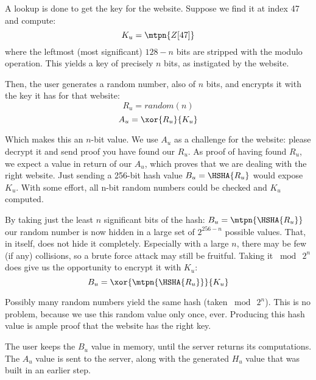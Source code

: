 A lookup is done to get the key for the website.
Suppose we find it at index 47 and compute:
\begin{equation}\label{rud:uku}
K_u = \mtpn{Z[47]}
\end{equation}
where the leftmost (most significant) $128 - n$ bits are stripped with the modulo operation.
This yields a key of precisely $n$ bits, as instigated by the website.
\par
Then, the user generates a random number, also of \(n\) bits, and encrypts it with the key it has for that website:
\begin{equation}\label{rud:uru}
R_u = random(n)
\end{equation}
\begin{equation}\label{rud:au}
A_u = \xor{R_u}{K_u}
\end{equation}
\par
Which makes this an \(n\)-bit value.
We use \(A_u\) as a challenge for the website: please decrypt it and send proof you have found our \(R_u\).
As proof of having found \(R_u\), we expect a value in return of our \(A_u\), which proves that we are dealing with the right website.
Just sending a 256-bit hash value
\(B_u = \HSHA{R_u}\)
would expose \(K_u\).
With some effort, all n-bit random numbers could be checked and \(K_u\) computed.
\par
By taking just the least \(n\) significant bits of the hash:
\(B_u = \mtpn{\HSHA{R_u}}\)
our random number is now hidden in a large set of \(2^{256-n}\) possible values.
That, in itself, does not hide it completely.
Especially with a large \(n\), there may be few (if any) collisions, so a brute force attack may still be fruitful.
Taking it \(\bmod\ 2^n\) does give us the opportunity to encrypt it with \(K_u\):
\begin{equation}\label{rud:bu}
B_u = \xor{\mtpn{\HSHA{R_u}}}{K_u}
\end{equation}
\par
Possibly many random numbers yield the same hash (taken \(\bmod\ 2^n\)).
This is no problem, because we use this random value only once, ever.
Producing this hash value is ample proof that the website has the right key.
\par
The user keeps the \(B_u\) value in memory, until the server returns its computations.
The \(A_u\) value is sent to the server, along with the generated \(H_u\) value that was built in an earlier step.
